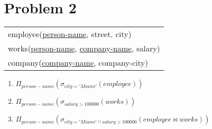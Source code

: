 \documentclass{article}
\begin{document}
\section*{Problem 2} \label{part2}

\begin{center}
    \begin{tabular}{l}
        employee(\underline{person-name}, street, city)\\
        works(\underline{person-name}, \underline{company-name}, salary)\\
        company(\underline{company-name}, company-city)
    \end{tabular}
\end{center}
\begin{enumerate}
    \item $\Pi_{person-name}(\sigma_{city='Miami'}(employee))$
    \item $\Pi_{person-name}(\sigma_{salary>100000}(works))$
    \item $\Pi_{person-name}(\sigma_{city='Miami' \cap salary>100000}(employee \bowtie works))$
\end{enumerate}
\end{document}
